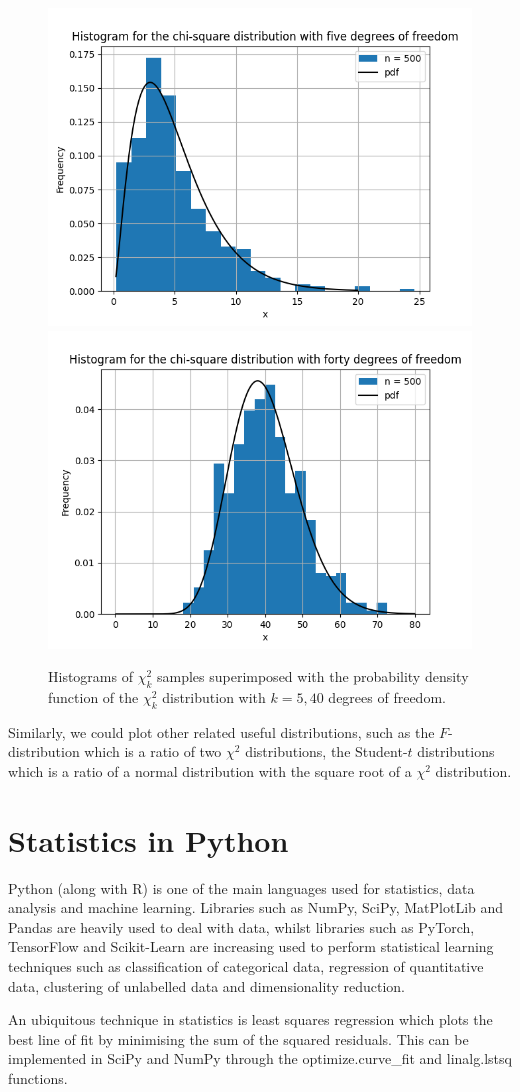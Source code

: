 \documentclass{article}
\begin{document}
\begin{figure}
    \centering
    \includegraphics[width=0.49\linewidth]{images/chi_square_500_5.png}
    \includegraphics[width=0.49\linewidth]{images/chi_square_500_40.png}
    \caption{Histograms of \(\chi^2_k\) samples superimposed with the probability density function of the \(\chi^2_k\) distribution with \(k = 5, 40\) degrees of freedom.}
\end{figure}

Similarly, we could plot other related useful distributions, such as the \(F\)-distribution which is a ratio of two \(\chi^2\) distributions, the Student-\(t\) distributions which is a ratio of a normal distribution with the square root of a \(\chi^2\) distribution.

\section{Statistics in Python}

Python (along with R) is one of the main languages used for statistics, data analysis and machine learning. Libraries such as NumPy, SciPy, MatPlotLib and Pandas are heavily used to deal with data, whilst libraries such as PyTorch, TensorFlow and Scikit-Learn are increasing used to perform statistical learning techniques such as classification of categorical data, regression of quantitative data, clustering of unlabelled data and dimensionality reduction.

An ubiquitous technique in statistics is least squares regression which plots the best line of fit by minimising the sum of the squared residuals. This can be implemented in SciPy and NumPy through the optimize.curve\_fit and linalg.lstsq functions. 
\end{document}
